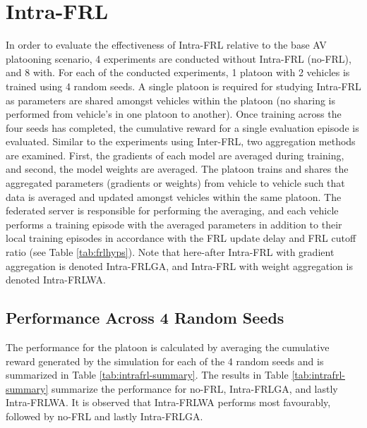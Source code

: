 \section{Intra-FRL}
In order to evaluate the effectiveness of Intra-FRL relative to the base AV platooning 
scenario, 4 experiments are conducted without Intra-FRL (no-FRL), and 8 with.  For each of 
the conducted experiments, 1 platoon with 2 vehicles is trained using 4 random seeds.  A 
single platoon is required for studying Intra-FRL as parameters are shared amongst 
vehicles within the platoon (no sharing is performed from vehicle's in one platoon to 
another).  Once training across the four seeds has completed, the cumulative reward for 
a single evaluation episode is evaluated.  Similar to the experiments using Inter-FRL, 
two aggregation methods are examined.  First, the gradients of each model are averaged 
during training, and second, the model weights are averaged.  The platoon trains and 
shares the aggregated parameters (gradients or weights) from vehicle to vehicle such 
that data is averaged and updated amongst vehicles within the same platoon. The federated 
server is responsible for performing the averaging, and each vehicle performs a training 
episode with the averaged parameters in addition to their local training episodes in 
accordance with the FRL update delay and FRL cutoff ratio (see Table \ref{tab:frlhyps}).  
Note that here-after Intra-FRL with gradient aggregation is denoted Intra-FRLGA, and 
Intra-FRL with weight aggregation is denoted Intra-FRLWA.


\subsection{Performance Across 4 Random Seeds}
The performance for the platoon is calculated by averaging the cumulative reward generated 
by the simulation for each of the 4 random seeds and is summarized in Table 
\ref{tab:intrafrl-summary}. The results in Table \ref{tab:intrafrl-summary} summarize 
the performance for no-FRL, Intra-FRLGA, and lastly Intra-FRLWA.  It is observed that 
Intra-FRLWA performs most favourably, followed by no-FRL and lastly Intra-FRLGA.  

